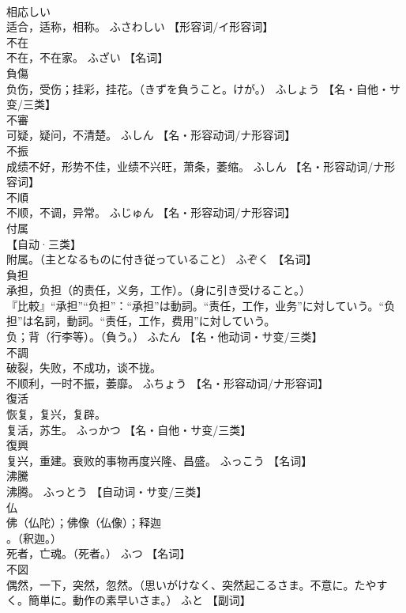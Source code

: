 \documentclass[8pt]{extreport}
\begin{document}
\begin{CJK}{UTF8}{min}
\\	相応しい	
\\	适合，适称，相称。	ふさわしい		【形容词/イ形容词】
\\	不在	
\\	不在，不在家。	ふざい		【名词】
\\	負傷	
\\	负伤，受伤；挂彩，挂花。（きずを負うこと。けが。）	ふしょう		【名・自他・サ变/三类】
\\	不審	
\\	可疑，疑问，不清楚。	ふしん		【名・形容动词/ナ形容词】
\\	不振	
\\	成绩不好，形势不佳，业绩不兴旺，萧条，萎缩。	ふしん		【名・形容动词/ナ形容词】
\\	不順	
\\	不顺，不调，异常。	ふじゅん		【名・形容动词/ナ形容词】
\\	付属	
\\	【自动·三类】 
\\	附属。（主となるものに付き従っていること）	ふぞく		【名词】
\\	負担	
\\	承担，负担（的责任，义务，工作）。（身に引き受けること。） 
\\	『比較』“承担”“负担”：“承担”は動詞。“责任，工作，业务”に対していう。“负担”は名詞，動詞。“责任，工作，费用”に対していう。 
\\	负；背（行李等）。（負う。）	ふたん		【名・他动词・サ变/三类】
\\	不調	
\\	破裂，失败，不成功，谈不拢。 
\\	不顺利，一时不振，萎靡。	ふちょう		【名・形容动词/ナ形容词】
\\	復活	
\\	恢复，复兴，复辟。 
\\	复活，苏生。	ふっかつ		【名・自他・サ变/三类】
\\	復興	
\\	复兴，重建。衰败的事物再度兴隆、昌盛。	ふっこう		【名词】
\\	沸騰	
\\	沸腾。	ふっとう		【自动词・サ变/三类】
\\	仏	
\\	佛（仏陀）；佛像（仏像）；释迦
\\	。（釈迦。） 
\\	死者，亡魂。（死者。）	ふつ		【名词】
\\	不図	
\\	偶然，一下，突然，忽然。（思いがけなく、突然起こるさま。不意に。たやすく。簡単に。動作の素早いさま。）	ふと		【副词】

\end{CJK}
\end{document}
